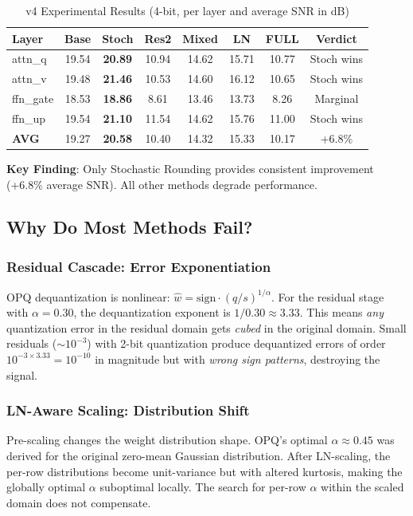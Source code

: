 \begin{table}[h]
\centering
\caption{v4 Experimental Results (4-bit, per layer and average SNR in dB)}
\label{tab:v4_results}
\begin{tabular}{l|cccccc|c}
\hline
\textbf{Layer} & \textbf{Base} & \textbf{Stoch} & \textbf{Res2} & \textbf{Mixed} & \textbf{LN} & \textbf{FULL} & \textbf{Verdict} \\
\hline
attn\_q  & 19.54 & \textbf{20.89} & 10.94 & 14.62 & 15.71 & 10.77 & Stoch wins \\
attn\_v  & 19.48 & \textbf{21.46} & 10.53 & 14.60 & 16.12 & 10.65 & Stoch wins \\
ffn\_gate& 18.53 & \textbf{18.86} &  8.61 & 13.46 & 13.73 &  8.26 & Marginal \\
ffn\_up  & 19.54 & \textbf{21.10} & 11.54 & 14.62 & 15.76 & 11.00 & Stoch wins \\
\hline
\textbf{AVG} & 19.27 & \textbf{20.58} & 10.40 & 14.32 & 15.33 & 10.17 & +6.8\% \\
\hline
\end{tabular}
\end{table}

\textbf{Key Finding}: Only Stochastic Rounding provides consistent
improvement (+6.8\% average SNR). All other methods degrade performance.

\subsection{Why Do Most Methods Fail?}

\subsubsection{Residual Cascade: Error Exponentiation}
OPQ dequantization is nonlinear: $\hat{w} = \text{sign} \cdot (q/s)^{1/\alpha}$.
For the residual stage with $\alpha=0.30$, the dequantization exponent
is $1/0.30 \approx 3.33$. This means \emph{any} quantization error in
the residual domain gets \emph{cubed} in the original domain. Small
residuals ($\sim 10^{-3}$) with 2-bit quantization produce dequantized
errors of order $10^{-3 \times 3.33} = 10^{-10}$ in magnitude but with
\emph{wrong sign patterns}, destroying the signal.

\subsubsection{LN-Aware Scaling: Distribution Shift}
Pre-scaling changes the weight distribution shape. OPQ's optimal
$\alpha \approx 0.45$ was derived for the original zero-mean Gaussian
distribution. After LN-scaling, the per-row distributions become
unit-variance but with altered kurtosis, making the globally optimal
$\alpha$ suboptimal locally. The search for per-row $\alpha$ within
the scaled domain does not compensate.

